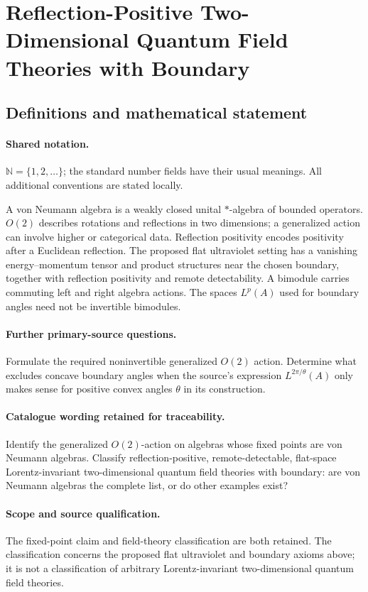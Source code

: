 \documentclass[11pt]{article}
\begin{document}
\section{Reflection-Positive Two-Dimensional Quantum Field Theories with Boundary}\label{statement}

\subsection{Definitions and mathematical statement}

\paragraph{Shared notation.}$\mathbb N=\{1,2,\ldots\}$; the standard number fields have their usual meanings. All additional conventions are stated locally.


A von Neumann algebra is a weakly closed unital $*$-algebra of bounded operators. $O(2)$ describes rotations and reflections in two dimensions; a generalized action can involve higher or categorical data. Reflection positivity encodes positivity after a Euclidean reflection. The proposed flat ultraviolet setting has a vanishing energy--momentum tensor and product structures near the chosen boundary, together with reflection positivity and remote detectability. A bimodule carries commuting left and right algebra actions. The spaces $L^p(A)$ used for boundary angles need not be invertible bimodules.

\paragraph{Further primary-source questions.}Formulate the required noninvertible generalized $O(2)$ action. Determine what excludes concave boundary angles when the source's expression $L^{2\pi/\theta}(A)$ only makes sense for positive convex angles $\theta$ in its construction.

\paragraph{Catalogue wording retained for traceability.}
Identify the generalized $O(2)$-action on algebras whose fixed points are von Neumann algebras. Classify reflection-positive, remote-detectable, flat-space Lorentz-invariant two-dimensional quantum field theories with boundary: are von Neumann algebras the complete list, or do other examples exist?

\paragraph{Scope and source qualification.}The fixed-point claim and field-theory classification are both retained. The classification concerns the proposed flat ultraviolet and boundary axioms above; it is not a classification of arbitrary Lorentz-invariant two-dimensional quantum field theories.
\end{document}
